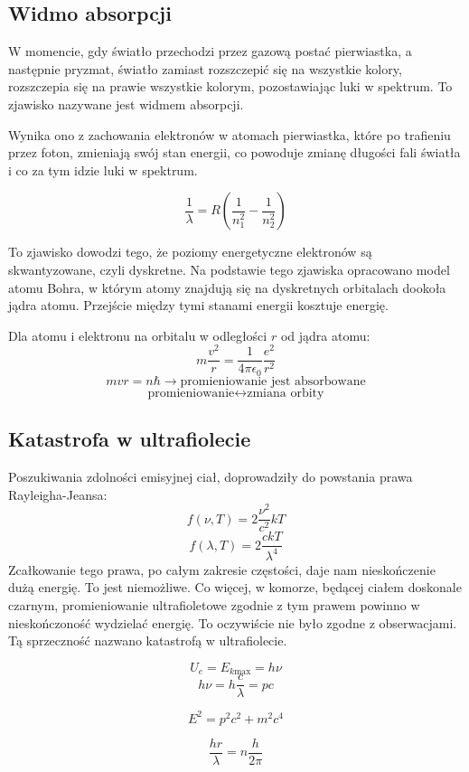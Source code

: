 \documentclass{../notatki}
\begin{document}
\subsection{Widmo absorpcji}

W momencie, gdy światło przechodzi przez gazową postać pierwiastka, a następnie
pryzmat, światło zamiast rozszczepić się na wszystkie kolory, rozszczepia się
na prawie wszystkie kolorym, pozostawiając luki w spektrum. To zjawisko
nazywane jest widmem absorpcji.

Wynika ono z zachowania elektronów w atomach pierwiastka, które po trafieniu
przez foton, zmieniają swój stan energii, co powoduje zmianę długości fali
światła i co za tym idzie luki w spektrum.

$$
\frac{1}{\lambda} = R \left( \frac{1}{n_1^2} - \frac{1}{n_2^2} \right)
$$

To zjawisko dowodzi tego, że poziomy energetyczne elektronów są skwantyzowane,
czyli dyskretne. Na podstawie tego zjawiska opracowano model atomu Bohra, w
którym atomy znajdują się na dyskretnych orbitalach dookoła jądra atomu.
Przejście między tymi stanami energii kosztuje energię.

Dla atomu i elektronu na orbitalu w odległości $r$ od jądra atomu:
$$
m \frac{v^2}{r} = \frac{1}{4 \pi \epsilon_0} \frac{e^2}{r^2}
$$
$$
mvr = n\hbar \rightarrow \text{promieniowanie jest absorbowane}
$$
$$
\text{promieniowanie} \leftrightarrow \text{zmiana orbity}
$$

\subsection{Katastrofa w ultrafiolecie}

Poszukiwania zdolności emisyjnej ciał, doprowadziły do powstania
prawa Rayleigha-Jeansa:
$$
f(\nu, T) = 2 \frac{\nu^2}{c^2} kT
$$
$$
f(\lambda, T) = 2 \frac{ckT}{\lambda^4}
$$
Zcałkowanie tego prawa, po całym zakresie częstości, daje nam nieskończenie dużą
energię. To jest niemożliwe. Co więcej, w komorze, będącej ciałem
doskonale czarnym, promieniowanie ultrafioletowe zgodnie z tym prawem
powinno w nieskończoność wydzielać energię. To oczywiście nie było
zgodne z obserwacjami. Tą sprzeczność nazwano katastrofą w ultrafiolecie.

$$
U_e = E_{k \text{max}} = h \nu
$$
$$
h\nu = h \frac{c}{\lambda} = pc
$$

$$
E^2 = p^2c^2 + m^2c^4
$$

$$
\frac{hr}{\lambda} = n \frac{h}{2 \pi}
$$
\end{document}

